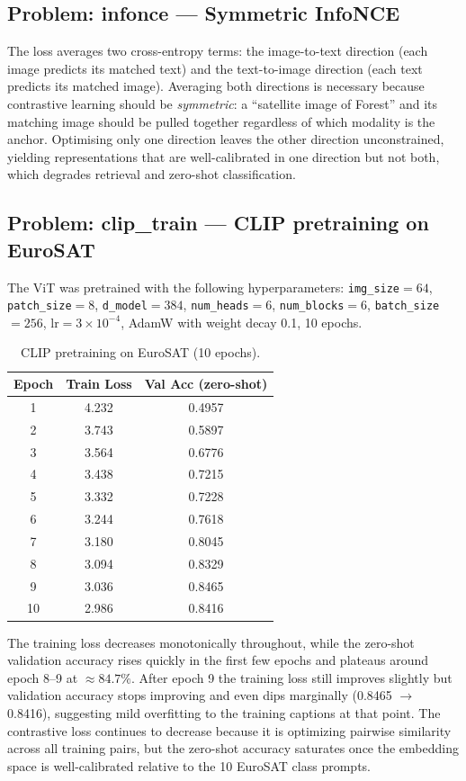 \documentclass[11pt]{article}
\begin{document}
\subsection*{Problem: infonce --- Symmetric InfoNCE}

The loss averages two cross-entropy terms: the image-to-text direction
(each image predicts its matched text) and the text-to-image direction
(each text predicts its matched image). Averaging both directions is
necessary because contrastive learning should be \emph{symmetric}: a
``satellite image of Forest'' and its matching image should be pulled
together regardless of which modality is the anchor. Optimising only
one direction leaves the other direction unconstrained, yielding
representations that are well-calibrated in one direction but not both,
which degrades retrieval and zero-shot classification.

\subsection*{Problem: clip\_train --- CLIP pretraining on EuroSAT}

The ViT was pretrained with the following hyperparameters:
\texttt{img\_size}$=64$, \texttt{patch\_size}$=8$, \texttt{d\_model}$=384$,
\texttt{num\_heads}$=6$, \texttt{num\_blocks}$=6$, \texttt{batch\_size}$=256$,
$\mathrm{lr}=3\times10^{-4}$, AdamW with weight decay 0.1, 10 epochs.

\begin{table}[H]
\centering
\caption{CLIP pretraining on EuroSAT (10 epochs).}
\begin{tabular}{ccc}
\toprule
Epoch & Train Loss & Val Acc (zero-shot) \\
\midrule
1  & 4.232 & 0.4957 \\
2  & 3.743 & 0.5897 \\
3  & 3.564 & 0.6776 \\
4  & 3.438 & 0.7215 \\
5  & 3.332 & 0.7228 \\
6  & 3.244 & 0.7618 \\
7  & 3.180 & 0.8045 \\
8  & 3.094 & 0.8329 \\
9  & 3.036 & 0.8465 \\
10 & 2.986 & 0.8416 \\
\bottomrule
\end{tabular}
\end{table}

The training loss decreases monotonically throughout, while the zero-shot
validation accuracy rises quickly in the first few epochs and plateaus around
epoch 8--9 at $\approx84.7\%$. After epoch 9 the training loss still improves
slightly but validation accuracy stops improving and even dips marginally
(0.8465 $\to$ 0.8416), suggesting mild overfitting to the training captions
at that point. The contrastive loss continues to decrease because it is
optimizing pairwise similarity across all training pairs, but the zero-shot
accuracy saturates once the embedding space is well-calibrated relative to
the 10 EuroSAT class prompts.
\end{document}

